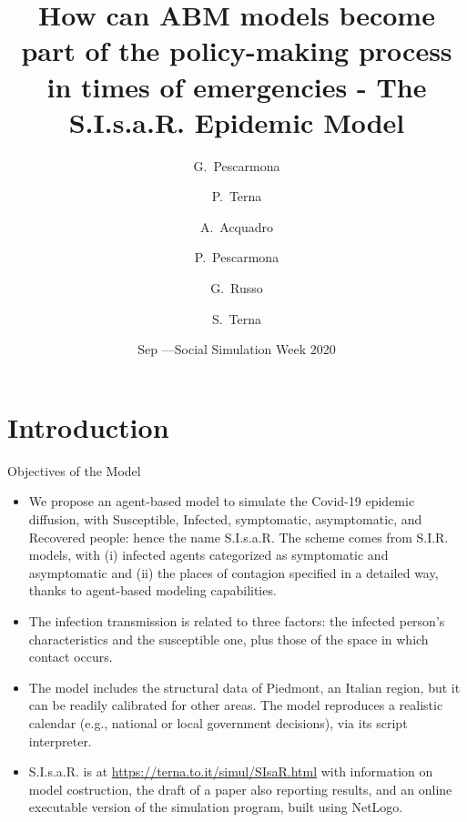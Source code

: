 \documentclass[8pt]{beamer}
\title[S.I.s.a.R. Epidemic Model] %
{How can ABM models become part of the policy-making process in times of emergencies - The S.I.s.a.R. Epidemic Model}
\author[] %
{G.~Pescarmona\inst{1} \and P.~Terna\inst{2} \and A.~Acquadro\inst{1} \and P.~Pescarmona\inst{3} \and G.~Russo\inst{4}  
\and S.~Terna\inst{5}  }
\institute[] %
{
  \inst{1}%
 University of Torino, Italy
  \and
  \inst{2}%
  University of Torino, Italy, retired \& Collegio Carlo Alberto, Italy
 \and
  \inst{3}%
  University of Groningen, The Netherlands  
  \and
  \inst{4}%
  Centro Einaudi, Torino, Italy
  \and
  \inst{5}%
 tomorrowdata.io
  }
\date[] %
{Sep \nth{16}---Social Simulation Week 2020}
\begin{document}
\begin{frame}
  \titlepage
\end{frame}


\section{Introduction}

\begin{frame}{Objectives of the Model}

  \begin{itemize}
  \item
We propose an agent-based model to simulate the Covid-19 epidemic diffusion, with Susceptible, Infected, symptomatic, asymptomatic, and Recovered people: hence the name S.I.s.a.R. The scheme comes from S.I.R. models, with (i) infected agents categorized as symptomatic and asymptomatic and (ii) the places of contagion specified in a detailed way, thanks to agent-based modeling capabilities. 

 \item
The infection transmission is related to three factors: the infected person's characteristics and the susceptible one, plus those of the space in which contact occurs.

  \item
The model includes the structural data of Piedmont, an Italian region, but it can be readily calibrated for other areas. The model reproduces a realistic calendar (e.g., national or local government decisions), via its script interpreter.  

\bigskip

 \item
 
S.I.s.a.R. is at \url{https://terna.to.it/simul/SIsaR.html} with information on model costruction, the draft of a paper also reporting results, and an online executable version of the simulation program, built using NetLogo.

 \end{itemize}
\end{frame}
\end{document}

